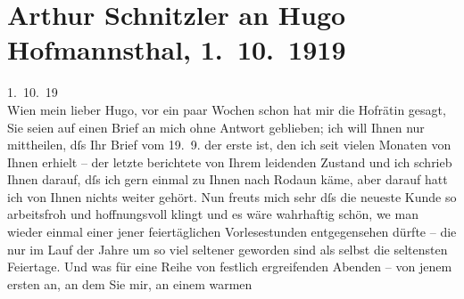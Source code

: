 

               \section[Arthur Schnitzler an Hugo Hofmannsthal, 1. 10. 1919]{ Arthur Schnitzler an Hugo Hofmannsthal, 1. 10. 1919}\nopagebreak{}\rehead{ }\begin{ledgroupsized}[t]{13cm}\normalsize\beginnumbering{} \toendnotes[C]{\smallbreak\pagebreak[2]} 
\toendnotes[C]{\smallbreak}\pstart
           \raggedleft{}{\pb}1. 10. 19{\\}Wien\pend
           \pstart
           mein lieber Hugo, vor ein paar Wochen schon hat mir die Hofrätin gesagt, Sie seien auf einen Brief an mich
               ohne Antwort geblieben; ich will Ihnen nur mittheilen, dſs Ihr Brief vom
                  19. 9. der erste ist, den ich seit vielen Monaten von Ihnen erhielt –
               der letzte berichtete von Ihrem leidenden Zustand und ich schrieb Ihnen darauf, dſs
               ich gern einmal zu Ihnen nach Rodaun käme, aber
               darauf hatt ich von Ihnen nichts weiter gehört. Nun freuts mich sehr dſs die neueste
               Kunde so arbeitsfroh und hoffnungsvoll klingt und es wäre wahrhaftig schön, we{\geminationn} man wieder einmal einer jener feiertäglichen
               Vorlesestunden entgegensehen dürfte – die nur im Lauf der Jahre um so viel seltener
               geworden sind als selbst die seltensten Feiertage. Und was für eine Reihe von
               festlich ergreifenden Abenden – von jenem ersten an, an dem Sie mir, an einem warmen

\end{ledgroupsized}
